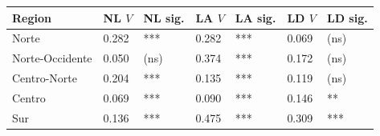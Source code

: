 \begin{tabular}{lllllll}
\toprule
Region & NL $V$ & NL sig. & LA $V$ & LA sig. & LD $V$ & LD sig. \\
\midrule
Norte & 0.282 & *** & 0.282 & *** & 0.069 & (ns) \\
Norte-Occidente & 0.050 & (ns) & 0.374 & *** & 0.172 & (ns) \\
Centro-Norte & 0.204 & *** & 0.135 & *** & 0.119 & (ns) \\
Centro & 0.069 & *** & 0.090 & *** & 0.146 & ** \\
Sur & 0.136 & *** & 0.475 & *** & 0.309 & *** \\
\bottomrule
\end{tabular}
%
